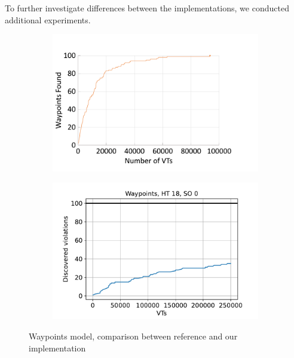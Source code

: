 \documentclass[
fancyheadings, %
%
%
]{stsreprt}
\begin{document}
To further investigate differences between the implementations, we conducted additional experiments.

\begin{figure}
    \begin{subfigure}[b]{.5\textwidth}
        \centering
        \includegraphics[width=\textwidth]{../evaluation/assets/EXP-00-grapple-paper-waypoints.pdf}
        \label{fig:evaluation:EXP-00:1}
    \end{subfigure}
    \begin{subfigure}[b]{.5\textwidth}
        \centering
        \includegraphics[width=\textwidth]{../evaluation/output-assets/EXP-00-comparison-with-paper.pdf}
        \label{fig:evaluation:EXP-00:2}
    \end{subfigure}
    \caption{Waypoints model, comparison between reference and our implementation}
    \label{fig:evaluation:EXP-00}
\end{figure}
\end{document}
